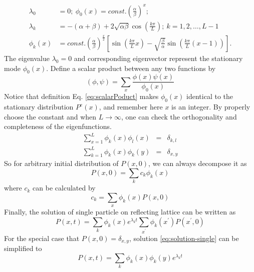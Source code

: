 \documentclass[12pt,a4paper]{article}
\begin{document}
\begin{equation}
    \label{eq:single-particle-eigenmodes}
    \begin{aligned}
        \lambda_0 & = 0; 
        ~\phi_0(x) = const. \left(\frac{\alpha}{\beta}\right)^{x}; \\
        \lambda_k & = -(\alpha+\beta) +
        2\sqrt{\alpha\beta}\cos(\frac{k\pi}{L}); 
        ~k=1,2,\dots, L-1 \\
        \phi_k(x) & = const. \left(\frac{\alpha}{\beta}\right)^{\frac{x}{2}}
            \left[\sin\left(\frac{k\pi}{L}x\right) -
                \sqrt{\frac{\beta}{\alpha}}\sin\left(\frac{k\pi}{L}(x-1)\right)\right].
    \end{aligned}
\end{equation}
The eigenvalue $\lambda_0 = 0$ and corresponding eigenvector represent the
stationary mode $\phi_0(x)$. 
Define a scalar product between any two functions by 
\begin{equation} \label{eq:scalarPoduct} (\phi, \psi) =
    \sum_{x}\frac{\phi(x)\psi(x)}{\phi_{0}(x)}
\end{equation}
Notice that definition Eq. \eqref{eq:scalarPoduct} makes $\phi_0(x)$ identical
to the stationary distribution $P^e(x)$, and remember here $x$ is an integer.
By properly choose the constant and when $L\rightarrow\infty$,
one can check the orthogonality and completeness of the eigenfunctions.
\begin{eqnarray}
    \label{eq:orthogonality}
    \sum_{x=1}^L \phi_k(x)\phi_l(x) & = & \delta_{k,l} \\
    \label{eq:completeness}
    \sum_{k=1}^L \phi_k(x)\phi_k(y) & = & \delta_{x,y} 
\end{eqnarray}
So for arbitrary initial distribution of $P(x, 0)$, we can always decompose it as 
\begin{equation}
    \label{eq:decompose-intial-single}
    P(x,0) = \sum_k{c_k \phi_k(x)}
\end{equation}
where $c_k$ can be calculated by 
\begin{equation}
    \label{eq:coeff-k}
    c_k = \sum_x{\phi_k(x) P(x,0)}
\end{equation}
Finally, the solution of single particle on reflecting lattice can be written as
\begin{equation}
    \label{eq:solution-single}
    P(x,t) = \sum_k{\phi_k(x)e^{\lambda_k
            t}}\sum_{x^\prime}{\phi_k(x^\prime)P(x^\prime,0)}
\end{equation}
For the special case that $P(x,0) = \delta_{x,y}$, solution
\eqref{eq:solution-single} can be simplified to
\begin{equation}
    \label{eq:solution-single-simplified}
    P(x,t) = \sum_k{\phi_k(x)\phi_k(y)e^{\lambda_k t}}
\end{equation}
\end{document}
